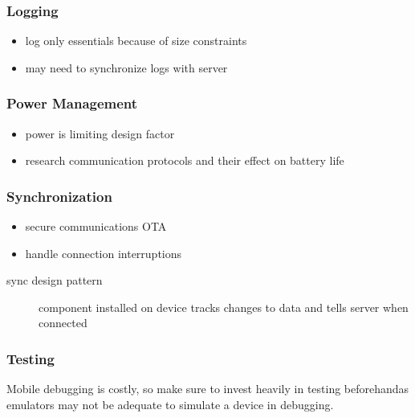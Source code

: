 \documentclass[]{article}
\theoremstyle{definition}
\begin{document}
	\subsubsection{Logging}
	\begin{itemize}
		\item log only essentials because of size constraints
		\item may need to synchronize logs with server
	\end{itemize}

	\subsubsection{Power Management}
	\begin{itemize}
		\item power is limiting design factor
		\item research communication protocols and their effect on battery life
	\end{itemize}

	\subsubsection{Synchronization}
	\begin{itemize}
		\item secure communications OTA
		\item handle connection interruptions
	\end{itemize}
	\begin{description}
		\item[sync design pattern] component installed on device tracks changes to data and tells server when connected
	\end{description}

	\subsubsection{Testing}
	Mobile debugging is costly, so make sure to invest heavily in testing beforehandas emulators may not be adequate to simulate a device in debugging.
\end{document}
